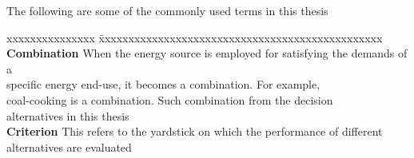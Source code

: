 \glossary

\noindent 
The following are some of the commonly used terms in this thesis
\begin{tabbing}
xxxxxxxxxxxxxxx \= xxxxxxxxxxxxxxxxxxxxxxxxxxxxxxxxxxxxxxxxxxxxxxxx \kill
\textbf{Combination   }   \> When the energy source is employed for satisfying the demands of a\\ \>  specific energy end-use, it becomes a combination. For example,\\ \> coal-cooking is a combination. Such combination from the decision \\ \>alternatives in this thesis \\
\textbf{Criterion} \> This refers to the yardstick on which the performance of different \\ \>alternatives are evaluated\\

\end{tabbing}

\pagebreak